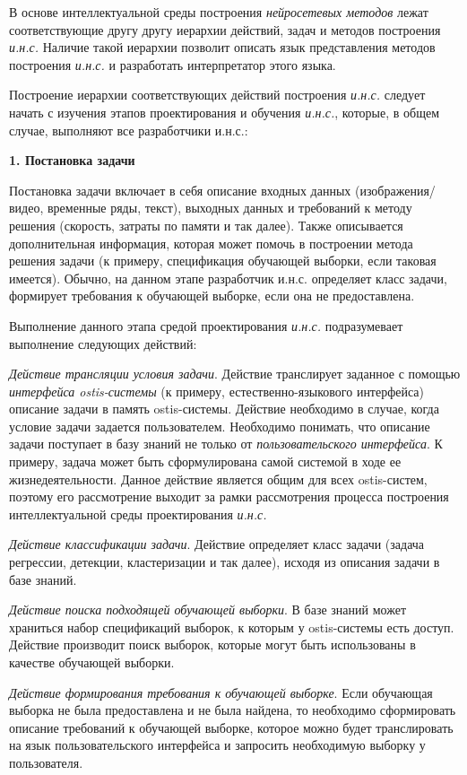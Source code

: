 В основе интеллектуальной среды построения \textit{нейросетевых методов} лежат соответствующие другу другу иерархии действий, задач и методов построения \textit{и.н.с.} Наличие такой иерархии позволит описать язык представления методов построения \textit{и.н.с.} и разработать интерпретатор этого языка.

Построение иерархии соответствующих действий построения \textit{и.н.с.} следует начать с изучения этапов проектирования и обучения \textit{и.н.с.}, которые, в общем случае, выполняют все разработчики и.н.с.:


\textbf{1. Постановка задачи}

Постановка задачи включает в себя описание входных данных (изображения/видео, временные ряды, текст), выходных данных и требований к методу решения (скорость, затраты по памяти и так далее). Также описывается дополнительная информация, которая может помочь в построении метода решения задачи (к примеру, спецификация обучающей выборки, если таковая имеется). Обычно, на данном этапе разработчик и.н.с. определяет класс задачи, формирует требования к обучающей выборке, если она не предоставлена.

Выполнение данного этапа средой проектирования \textit{и.н.с.} подразумевает выполнение следующих действий:
\begin{textitemize}
	\item \textit{Действие трансляции условия задачи}. Действие транслирует заданное с помощью \textit{интерфейса ostis-системы} (к примеру, естественно-языкового интерфейса) описание задачи в память ostis-системы. Действие необходимо в случае, когда условие задачи задается пользователем. Необходимо понимать, что описание задачи поступает в базу знаний не только от \textit{пользовательского интерфейса}. К примеру, задача может быть сформулирована самой системой в ходе ее жизнедеятельности.
	Данное действие является общим для всех ostis-систем, поэтому его рассмотрение выходит за рамки рассмотрения процесса построения интеллектуальной среды проектирования \textit{и.н.с.}
	\item \textit{Действие классификации задачи}. Действие определяет класс задачи (задача регрессии, детекции, кластеризации и так далее), исходя из описания задачи в базе знаний.
	\item \textit{Действие поиска подходящей обучающей выборки}. В базе знаний может храниться набор спецификаций выборок, к которым у ostis-системы есть доступ. Действие производит поиск выборок, которые могут быть использованы в качестве обучающей выборки.
	\item \textit{Действие формирования требования к обучающей выборке}. Если обучающая выборка не была предоставлена и не была найдена, то необходимо сформировать описание требований к обучающей выборке, которое можно будет транслировать на язык пользовательского интерфейса и запросить необходимую выборку у пользователя.
\end{textitemize}


